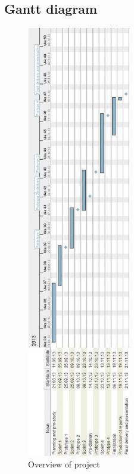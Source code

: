 \documentclass[11pt]{book}
\begin{document}
\subsection{Gantt diagram}
\begin{figure}[H]
      \centering
      \includegraphics[width=0.4\textwidth]{Figures/gantt.jpg}
      \caption{Overview of project}
      \label{fig:plan_gantt}
\end{figure}
\end{document}
